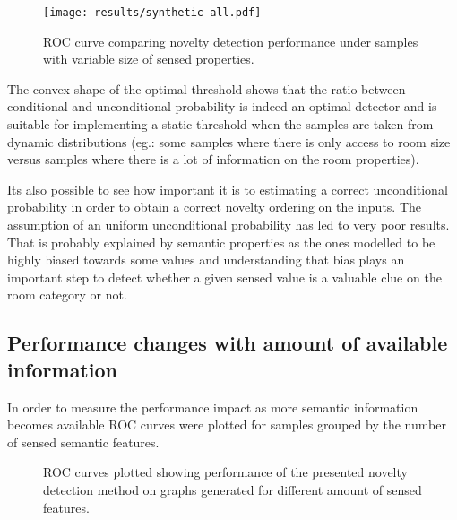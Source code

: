 \documentclass[runningheads,a4paper]{llncs}
\begin{document}
\begin{figure}[h]
\centering
\texttt{[image: results/synthetic-all.pdf]}

\caption{\label{fig:synthetic-roc}ROC curve comparing novelty detection performance
         under samples with variable size of sensed properties.}
\end{figure}

The convex shape of the optimal threshold shows that the ratio between conditional
and unconditional probability is indeed an optimal detector and is suitable for
implementing a static threshold when the samples are taken from dynamic
distributions (eg.: some samples where there is only access to room size versus
samples where there is a lot of information on the room properties).

Its also possible to see how important it is to estimating a correct unconditional
probability in order to obtain a correct novelty ordering on the inputs.
The assumption of an uniform unconditional probability has led to very poor results.
That is probably explained by semantic properties as the ones modelled to be highly
biased towards some values and understanding that bias plays an important step
to detect whether a given sensed value is a valuable clue on the room category
or not.



\subsection{Performance changes with amount of available information}
In order to measure the performance impact as more semantic information becomes
available ROC curves were plotted for samples grouped by the number of sensed
semantic features.

\begin{figure}[h]
\centering

\qquad
{}

\qquad
{}

\caption{\label{fig:synthetic-roc-breakdown}ROC curves plotted showing performance of the
         presented novelty detection method on graphs generated for different amount of
         sensed features.}
\end{figure}
\end{document}
